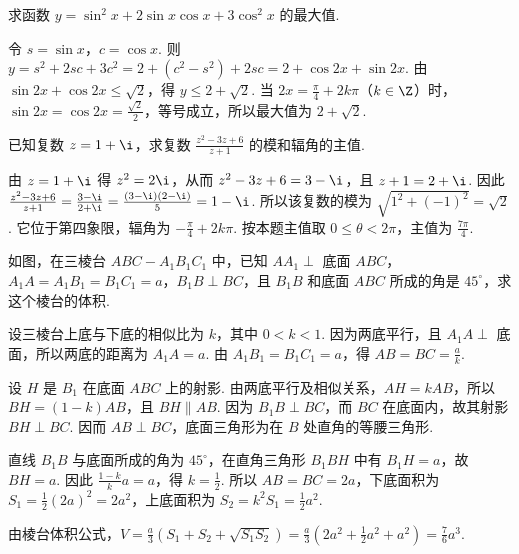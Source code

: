 \begin{problem}
求函数 \(y = \sin^{2} x + 2\sin x\cos x + 3\cos^{2} x\) 的最大值.
\end{problem}

\begin{solution}
令 \(s=\sin x\)，\(c=\cos x\). 则
\(y=s^2+2sc+3c^2=2+(c^2-s^2)+2sc=2+\cos2x+\sin2x\).
由 \(\sin2x+\cos2x\leq\sqrt2\)，得 \(y\leq2+\sqrt2\). 当 \(2x=\frac\pi4+2k\pi\)（\(k\in\Z\)）时，\(\sin2x=\cos2x=\frac{\sqrt2}{2}\)，等号成立，所以最大值为 \(2+\sqrt2\).
\end{solution}

\begin{problem}
已知复数 \(z = 1 + \i\)，求复数 \(\frac{z^{2} - 3z + 6}{z + 1}\) 的模和辐角的主值.
\end{problem}

\begin{solution}
由 \(z=1+\i\) 得 \(z^2=2\i\)，从而 \(z^2-3z+6=3-\i\)，且 \(z+1=2+\i\). 因此
\(\frac{z^2-3z+6}{z+1}=\frac{3-\i}{2+\i}=\frac{(3-\i)(2-\i)}{5}=1-\i\).
所以该复数的模为 \(\sqrt{1^2+(-1)^2}=\sqrt2\). 它位于第四象限，辐角为 \(-\frac\pi4+2k\pi\). 按本题主值取 \(0\leq\theta<2\pi\)，主值为 \(\frac{7\pi}{4}\).
\end{solution}

\begin{problem}
如图，在三棱台 \(ABC - A_{1}B_{1}C_{1}\) 中，已知 \(AA_{1}\perp\) 底面 \(ABC\)，\(A_{1}A=A_{1}B_{1}=B_{1}C_{1}=a\)，\(B_{1}B\perp BC\)，且 \(B_{1}B\) 和底面 \(ABC\) 所成的角是 \(45^{\circ}\)，求这个棱台的体积.

\end{problem}

\begin{solution}
设三棱台上底与下底的相似比为 \(k\)，其中 \(0<k<1\). 因为两底平行，且 \(A_1A\perp\) 底面，所以两底的距离为 \(A_1A=a\). 由 \(A_1B_1=B_1C_1=a\)，得 \(AB=BC=\frac{a}{k}\).

设 \(H\) 是 \(B_1\) 在底面 \(ABC\) 上的射影. 由两底平行及相似关系，\(AH=kAB\)，所以 \(BH=(1-k)AB\)，且 \(BH\parallel AB\). 因为 \(B_1B\perp BC\)，而 \(BC\) 在底面内，故其射影 \(BH\perp BC\). 因而 \(AB\perp BC\)，底面三角形为在 \(B\) 处直角的等腰三角形.

直线 \(B_1B\) 与底面所成的角为 \(45^\circ\)，在直角三角形 \(B_1BH\) 中有 \(B_1H=a\)，故 \(BH=a\). 因此 \(\frac{1-k}{k}a=a\)，得 \(k=\frac12\). 所以 \(AB=BC=2a\)，下底面积为 \(S_1=\frac12(2a)^2=2a^2\)，上底面积为 \(S_2=k^2S_1=\frac12a^2\).

由棱台体积公式，\(V=\frac{a}{3}\left(S_1+S_2+\sqrt{S_1S_2}\right)=\frac{a}{3}\left(2a^2+\frac12a^2+a^2\right)=\frac76a^3\).
\end{solution}

